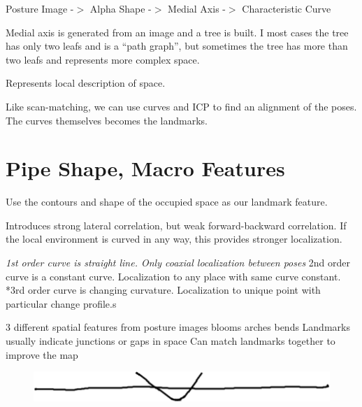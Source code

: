 Posture Image -$>$ Alpha Shape -$>$ Medial Axis -$>$ Characteristic Curve

Medial axis is generated from an image and a tree is built. I most cases the tree has only two leafs and is a “path graph”, but sometimes the tree has more than two leafs and represents more complex space.

Represents local description of space. 

Like scan-matching, we can use curves and ICP to find an alignment of the poses. The curves themselves becomes the landmarks.

\section{Pipe Shape, Macro Features}
\label{pipeshapemacrofeatures}

Use the contours and shape of the occupied space as our landmark feature. 

Introduces strong lateral correlation, but weak forward-backward correlation. If the local environment is curved in any way, this provides stronger localization.

\emph{1st order curve is straight line. Only coaxial localization between poses
}2nd order curve is a constant curve. Localization to any place with same curve constant.
*3rd order curve is changing curvature. Localization to unique point with particular change profile.s

3 different spatial features from posture images
blooms
arches
bends
Landmarks usually indicate junctions or gaps in space
Can match landmarks together to improve the map

\begin{figure}[htbp]
\centering
\includegraphics[keepaspectratio,width=\textwidth,height=0.75\textheight]{PastedGraphic1.pdf}
\label{pastedgraphic1.pdf}
\end{figure}



